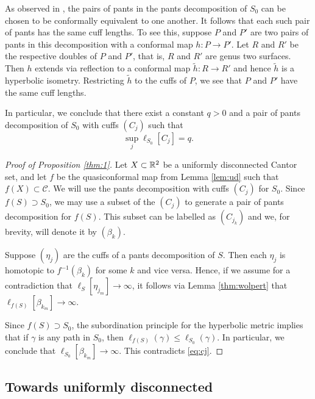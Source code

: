\documentclass{amsart}
\begin{document}
As observed in \cite[p.5]{Shiga}, the pairs of pants in the pants decomposition of $S_0$ can be chosen to be conformally equivalent to one another. It follows that each such pair of pants has the same cuff lengths. To see this, suppose $P$ and $P'$ are two pairs of pants in this decomposition with a conformal map $h: P \to P'$. Let $R$ and $R'$ be the respective doubles of $P$ and $P'$, that is, $R$ and $R'$ are genus two surfaces. Then $h$ extends via reflection to a conformal map $\widetilde{h}: R \to R'$ and hence $\widetilde{h}$ is a hyperbolic isometry. Restricting $\widetilde{h}$ to the cuffs of $P$, we see that $P$ and $P'$ have the same cuff lengths.

In particular, we conclude that there exist a constant $q>0$ and a pair of pants decomposition of $S_0$ with cuffs $(C_j)$ such that
\begin{equation}
\label{eq:cj}
\sup_j \ell_{S_0} [ C_j ] = q.
\end{equation} 

\begin{proof}[Proof of Proposition \ref{thm:1}]
Let $X\subset \mathbb{R}^2$ be a uniformly disconnected Cantor set, and let $f$ be the quasiconformal map from Lemma \ref{lem:ud} such that $f(X) \subset \mathcal{C}$. We will use the pants decomposition with cuffs $(C_j)$ for $S_0$. Since $f(S) \supset S_0$, we may use a subset of the $(C_j)$ to generate a pair of pants decomposition for $f(S)$. This subset can be labelled as $(C_{j_k})$ and we, for brevity, will denote it by $(\beta_k)$.

Suppose $(\eta_j)$ are the cuffs of a pants decomposition of $S$. Then each $\eta_j$ is homotopic to $f^{-1}(\beta_k)$ for some $k$ and vice versa. Hence, if we assume for a contradiction that $\ell_S [ \eta_{j_m} ] \to \infty$, it follows via Lemma \ref{thm:wolpert} that $\ell_{f(S)} [ \beta_{k_m} ] \to \infty$. 

Since $f(S) \supset S_0$, the subordination principle for the hyperbolic metric implies that if $\gamma$ is any path in $S_0$, then $\ell_{f(S)} ( \gamma ) \leq \ell_{S_0} (\gamma)$. In particular, we conclude that $\ell _{S_0} [ \beta_{k_m} ] \to \infty$. This contradicts \eqref{eq:cj}.
\end{proof}



\subsection{Towards uniformly disconnected}\label{sec:HimpliesUD} 
\end{document}

